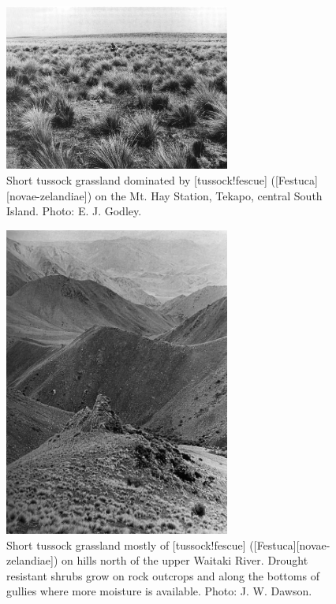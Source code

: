 \begin{figure}
	\includegraphics[width=0.66\textwidth]{graphics/figure81short-tussock.jpg}
	\centering
		\caption[Short tussock grassland dominated by fescue-tussock]{Short tussock grassland dominated by [tussock!fescue] ([Festuca][novae-zelandiae]) on the Mt.
		Hay Station, Tekapo, central South Island.
		Photo:  E. J. Godley.}%
		\label{fig:81short-tussock}
\end{figure}
\begin{figure}
	\includegraphics[width=0.66\textwidth]{graphics/figure82short-tussock.jpg}
	\centering
		\caption[Short tussock grassland mostly of \emph{Festuca novae-zelandiae}]{Short tussock grassland mostly of [tussock!fescue] ([Festuca][novae-zelandiae]) on hills north of the upper Waitaki River.
		Drought resistant shrubs grow on rock outcrops and along the bottoms of gullies where more moisture is available.  Photo:  J. W. Dawson.}%
		\label{fig:82short-tussock}
\end{figure}
